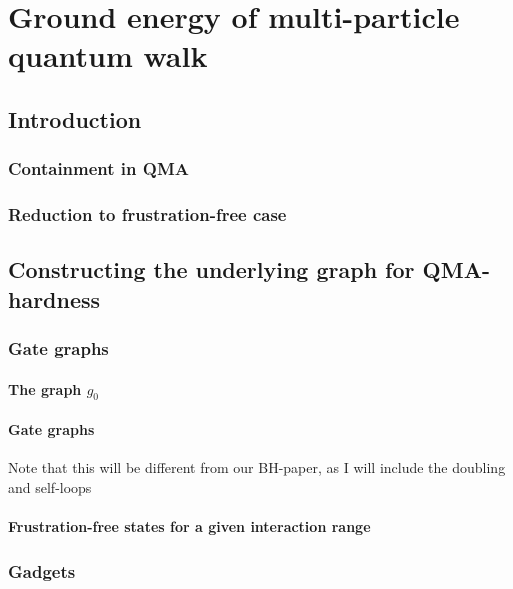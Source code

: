 % 

\chapter{Ground energy of multi-particle quantum walk}

\section{Introduction}
\subsection{Containment in QMA}
\subsection{Reduction to frustration-free case}


\section{Constructing the underlying graph for QMA-hardness}

\subsection{Gate graphs}
\subsubsection{The graph $g_0$}

\subsubsection{Gate graphs}

Note that this will be different from our BH-paper, as I will include the doubling and self-loops

\subsubsection{Frustration-free states for a given interaction range}

\subsection{Gadgets}

